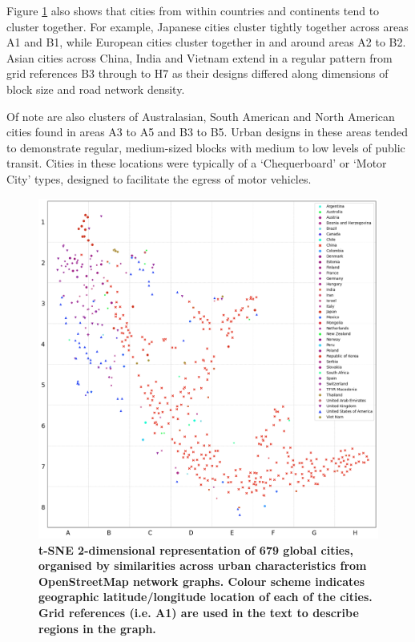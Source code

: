 \documentclass[preprint,12pt]{elsarticle}
\begin{document}
Figure \ref{fig:tSNE} also shows that cities from within countries and continents tend to cluster together. For example, Japanese cities cluster tightly together across areas A1 and B1, while European cities cluster together in and around areas A2 to B2. Asian cities across China, India and Vietnam extend in a regular pattern from grid references B3 through to H7 as their designs differed along dimensions of block size and road network density.

Of note are also clusters of Australasian, South American and North American cities found in areas A3 to A5 and B3 to B5. Urban designs in these areas tended to demonstrate regular, medium-sized blocks with medium to low levels of public transit. Cities in these locations were typically of a `Chequerboard' or `Motor City' types, designed to facilitate the egress of motor vehicles.

\begin{figure}
\centering
\includegraphics[trim={ 0 0 0 0 },clip,scale=0.45]{Images/ByCountry_latlong_Zeigler.png}%
\caption{\bf t-SNE 2-dimensional representation of 679 global cities, organised by similarities across urban characteristics from OpenStreetMap network graphs. Colour scheme indicates geographic latitude/longitude location\cite{Jackle2017} of each of the cities. Grid references (i.e. A1) are used in the text to describe regions in the graph.}
 \label{fig:tSNE}
\end{figure}
\end{document}

